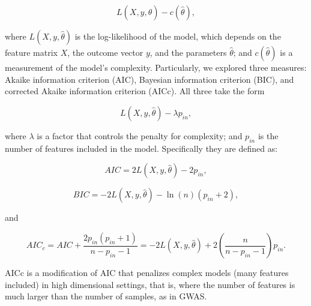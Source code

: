 \documentclass[a4paper]{article}
\begin{document}
    $$L(X,y,\hat{\theta})-c(\hat{\theta}),$$
    
    where $L(X,y,\hat{\theta})$ is the log-likelihood of the model, which depends on the feature matrix $X$, the outcome vector $y$, and the parameters $\hat{\theta}$; and $c(\hat{\theta})$ is a measurement of the model's complexity. Particularly, we explored three measures: Akaike information criterion (AIC), Bayesian information criterion (BIC), and corrected Akaike information criterion (AICc). All three take the form
    
    $$L(X,y,\hat{\theta})-\lambda p_{in},$$
    
    where $\lambda$ is a factor that controls the penalty for complexity; and $p_{in}$ is the number of features included in the model. Specifically they are defined as:
    
    $$ AIC=2L(X,y,\hat{\theta})-2p_{in} ,$$

    $$ BIC = -2L(X,y,\hat{\theta})-\ln(n)(p_{in}+ 2) ,$$

    and

    $$ AIC_c=AIC+\frac{2p_{in}(p_{in}+1)}{n-p_{in}-1}=-2L(X,y,\hat{\theta})+2\left(\dfrac{n}{n-p_{in}-1}\right)p_{in} .$$

    AICc is a modification of AIC that penalizes complex models (many features included) in high dimensional settings, that is, where the number of features is much larger than the number of samples, as in GWAS.
    
\end{document}
